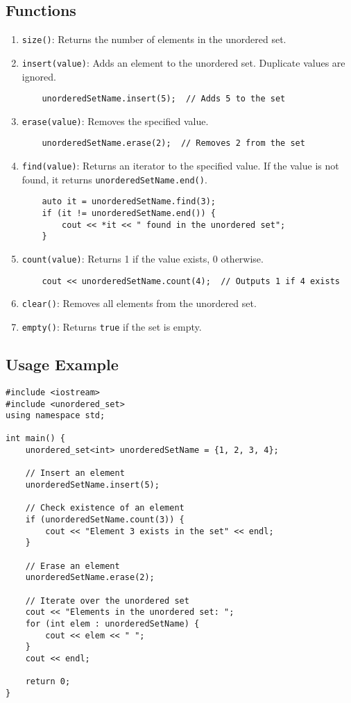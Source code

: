 \documentclass{article}
\begin{document}
\subsection{Functions}

\begin{enumerate}
    \item \texttt{size()}: Returns the number of elements in the unordered set.
    \item \texttt{insert(value)}: Adds an element to the unordered set. Duplicate values are ignored.
    \begin{lstlisting}
    unorderedSetName.insert(5);  // Adds 5 to the set
    \end{lstlisting}
    \item \texttt{erase(value)}: Removes the specified value.
    \begin{lstlisting}
    unorderedSetName.erase(2);  // Removes 2 from the set
    \end{lstlisting}
    \item \texttt{find(value)}: Returns an iterator to the specified value. If the value is not found, it returns \texttt{unorderedSetName.end()}.
    \begin{lstlisting}
    auto it = unorderedSetName.find(3);
    if (it != unorderedSetName.end()) {
        cout << *it << " found in the unordered set";
    }
    \end{lstlisting}
    \item \texttt{count(value)}: Returns 1 if the value exists, 0 otherwise.
    \begin{lstlisting}
    cout << unorderedSetName.count(4);  // Outputs 1 if 4 exists
    \end{lstlisting}
    \item \texttt{clear()}: Removes all elements from the unordered set.
    \item \texttt{empty()}: Returns \texttt{true} if the set is empty.
\end{enumerate}

\subsection{Usage Example}

\begin{lstlisting}
#include <iostream>
#include <unordered_set>
using namespace std;

int main() {
    unordered_set<int> unorderedSetName = {1, 2, 3, 4};

    // Insert an element
    unorderedSetName.insert(5);

    // Check existence of an element
    if (unorderedSetName.count(3)) {
        cout << "Element 3 exists in the set" << endl;
    }

    // Erase an element
    unorderedSetName.erase(2);

    // Iterate over the unordered set
    cout << "Elements in the unordered set: ";
    for (int elem : unorderedSetName) {
        cout << elem << " ";
    }
    cout << endl;

    return 0;
}
\end{lstlisting}
\end{document}

